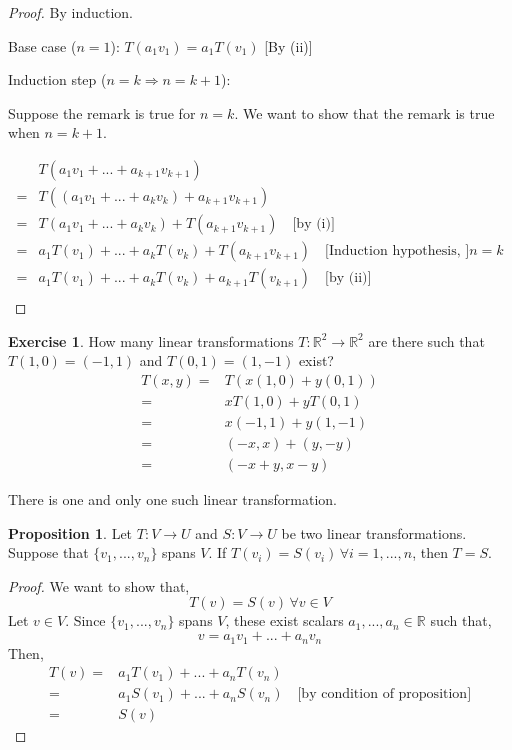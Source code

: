 \documentclass{report}
\theoremstyle{definition}
\newtheorem{_exc}{Exercise}[section]
\newtheorem{_prop}[_thm]{Proposition}
\theoremstyle{remark}
\begin{document}
\begin{proof}
By induction.

Base case ($n=1$): $T(a_1v_1)=a_1T(v_1)$ [By (ii)]

Induction step ($n=k\Rightarrow n=k+1$):

Suppose the remark is true for $n=k$.
We want to show that the remark is true when $n=k+1$.

\begin{align*}
& T(a_1v_1+...+a_{k+1}v_{k+1}) \\
=& T((a_1v_1+...+a_kv_k)+a_{k+1}v_{k+1}) \\
=& T(a_1v_1+...+a_kv_k)+T(a_{k+1}v_{k+1}) \quad \text{[by (i)]}\\
=& a_1T(v_1)+...+a_kT(v_k)+T(a_{k+1}v_{k+1}) \quad \text{[Induction hypothesis, ]}n=k\\
=& a_1T(v_1)+...+a_kT(v_k)+a_{k+1}T(v_{k+1}) \quad \text{[by (ii)]}\\
\end{align*}
\end{proof}

\begin{_exc}
How many linear transformations $T:\mathbb{R}^2\rightarrow \mathbb{R}^2$ are there such that $T(1,0)=(-1,1)$ and $T(0,1)=(1,-1)$ exist?
\begin{align*}
T(x,y)=&T(x(1,0)+y(0,1)) \\
=&xT(1,0)+yT(0,1) \\
=&x(-1,1)+y(1,-1) \\
=&(-x,x)+(y,-y) \\
=&(-x+y, x-y)
\end{align*}

There is one and only one such linear transformation.
\end{_exc}

\begin{_prop}
Let $T:V\rightarrow U$ and $S:V\rightarrow U$ be two linear transformations.
Suppose that $\{v_1,...,v_n\}$ spans $V$.
If $T(v_i)=S(v_i) \, \forall i=1,...,n$, then $T=S$.
\end{_prop}

\begin{proof}
We want to show that,
\[T(v)=S(v)\, \forall v\in V\]
Let $v\in V$.
Since $\{v_1,...,v_n\}$ spans $V$, these exist scalars $a_1,...,a_n\in \mathbb{R}$ such that,
\[v=a_1v_1+...+a_nv_n\]
Then,
\begin{align*}
T(v)=&a_1T(v_1)+...+a_nT(v_n) \\
=&a_1S(v_1)+...+a_nS(v_n) \quad \text{[by condition of proposition]} \\
=&S(v)
\end{align*}
\end{proof}
\end{document}
